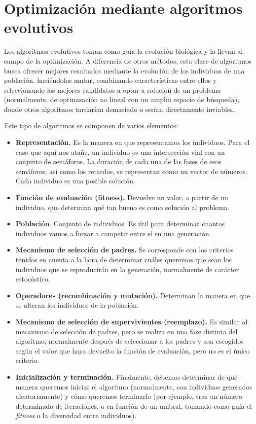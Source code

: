 \section{Optimización mediante algoritmos evolutivos}

Los algoritmos evolutivos toman como guía la evolución biológica y la llevan al campo de la optimización. A diferencia de otros métodos, esta clase de algoritmos busca ofrecer mejores resultados mediante la evolución de los individuos de una población, haciéndolos mutar, combinando características entre ellos y seleccionando los mejores candidatos a optar a solución de un problema~\cite{eiben_introduction_2003} (normalmente, de optimización no lineal con un amplio espacio de búsqueda), donde otros algoritmos tardarían demasiado o serían directamente inviables.

Este tipo de algoritmos se componen de varios elementos:

\begin{itemize}
    \item \textbf{Representación.} Es la manera en que representamos los individuos. Para el caso que aquí nos atañe, un individuo es una intersección vial con un conjunto de semáforos. La duración de cada una de las fases de esos semáforos, así como los retardos, se representan como un vector de números. Cada individuo es una posible solución.
    \item \textbf{Función de evaluación (fitness).} Devuelve un valor, a partir de un individuo, que determina qué tan bueno es como solución al problema.
    \item \textbf{Población}. Conjunto de individuos. Es útil para determinar cuantos individuos vamos a forzar a competir entre sí en una generación.
    \item \textbf{Mecanismo de selección de padres.} Se corresponde con los criterios tenidos en cuenta a la hora de determinar cuáles queremos que sean los individuos que se reproducirán en la generación, normalmente de carácter estocástico.
    \item \textbf{Operadores (recombinación y mutación).} Determinan la manera en que se alteran los individuos de la población.
    \item \textbf{Mecanismo de selección de supervivientes (reemplazo).} Es similar al mecanismo de selección de padres, pero se realiza en una fase distinta del algoritmo; normalmente después de seleccionar a los padres y son escogidos según el valor que haya devuelto la función de evaluación, pero no es el único criterio.
    \item \textbf{Inicialización y terminación.} Finalmente, debemos determinar de qué manera queremos iniciar el algoritmo (normalmente, con individuos generados aleatoriamente) y cómo queremos terminarlo (por ejemplo, tras un número determinado de iteraciones, o en función de un umbral, tomando como guía el \textit{fitness} o la diversidad entre individuos).
\end{itemize}


